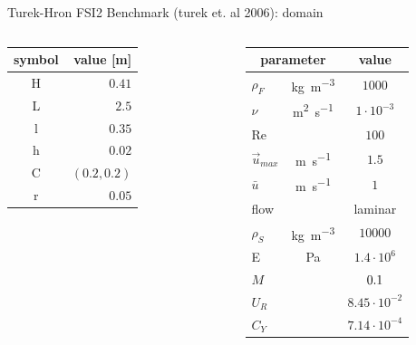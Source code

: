 \documentclass[10pt,t]{beamer}
\begin{document}
\begin{frame}{Turek-Hron FSI2 Benchmark (turek et. al 2006): domain}
\begin{columns}
    	\scriptsize
		\begin{tabular}{ c | r } 
			symbol & value [m]  \\
			\hline
			H  & $0.41$     \\
			L  & $2.5$  \\
			l  & $0.35$  \\
			h  & $0.02$  \\
			C  & $\left(0.2,0.2 \right)$  \\
			r  & $0.05$  \\
			\end{tabular}

		\vspace{0.5cm}
		\begin{tabular}{ l c  | c } 
			\multicolumn{2}{c|}{parameter} & value  \\ 
			\hline
			$\rho_F$ & \si{kg.m^{-3}} & \cellcolor{blue!20} $1000$   \\
			$\nu$& \si{m^2.s^{-1}} & \cellcolor{blue!20} $1 \cdot 10^{-3}$  \\
			Re &  & \cellcolor{blue!20} $100$ \\
			$\vec{u}_{max}$ & \si{m.s^{-1}} & \cellcolor{blue!20} $1.5$ \\
			$\bar{u}$ & \si{m.s^{-1}} & \cellcolor{blue!20} $1$ \\
			flow & & \cellcolor{blue!20} laminar \\
			\hline
			$\rho_S$ & \si{kg.m^{-3}} & \cellcolor{orange!50} $10000$    \\
			E & \si{Pa} & \cellcolor{orange!50} $1.4\cdot 10^6$    \\
			\hline
			$M$ & & $ \cellcolor{green!10} 0.1$     \\
			\hline
			$U_R$ & & $ 8.45\cdot 10^{-2}$  \\
			$C_Y$ & & $  7.14 \cdot 10^{-4}$  \\			

		\end{tabular}
\end{columns}


    
\end{frame}
\end{document}
